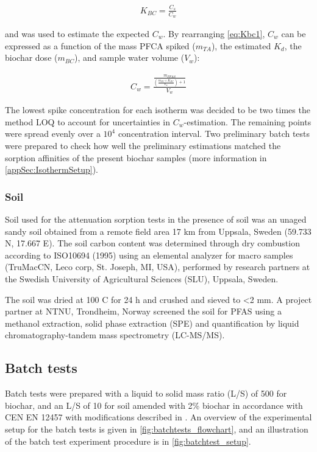 \begin{align}
    \label{eq:Kbc1}
    K_{BC} = \frac{C_s}{C_w}
\end{align}

and was used to estimate the expected $C_w$. By rearranging \cref{eq:Kbc1}, $C_w$ can be expressed as a function of the mass PFCA spiked ($m_{TA}$), the estimated $K_d$, the biochar dose ($m_{BC}$), and sample water volume ($V_w$):

\begin{align}
    \label{eq:Cw2}
    C_w=\frac{\frac{m_{PFAS}}{\left (\frac{m_{BC}\times K_{BC}}{V_w}\right)+1}}{V_w}
\end{align}

The lowest spike concentration for each isotherm was decided to be two times the method LOQ to account for uncertainties in $C_w$-estimation. The remaining points were spread evenly over a $10^4$ concentration interval. Two preliminary batch tests were prepared to check how well the preliminary estimations matched the sorption affinities of the present biochar samples (more information in \cref{appSec:IsothermSetup}).

\subsubsection{Soil}
Soil used for the attenuation sorption tests in the presence of soil was an unaged sandy soil obtained from a remote field area 17 km from Uppsala, Sweden (59.733 N, 17.667 E). The soil carbon content was determined through dry combustion according to ISO10694 (1995) using an elemental analyzer for macro samples (TruMac\textregistered CN, Leco corp, St. Joseph, MI, USA), performed by research partners at the Swedish University of Agricultural Sciences (SLU), Uppsala, Sweden. 

The soil was dried at 100 \textdegree C for 24 h and crushed and sieved to \textless 2 mm.  A project partner at NTNU, Trondheim, Norway screened the soil for PFAS using a methanol extraction, solid phase extraction (SPE) and quantification by liquid chromatography-tandem mass spectrometry (LC-MS/MS). 

\subsection{Batch tests\label{sec:S-BC}}
Batch tests were prepared with a liquid to solid mass ratio (L/S) of 500 for biochar, and an L/S of 10 for soil amended with 2\% biochar in accordance with CEN EN 12457 with modifications described in \citep{Hale2017fire, kupryianchyk2016biochar}. An overview of the experimental setup for the batch tests is given in \cref{fig:batchtests_flowchart}, and an illustration of the batch test experiment procedure is in \cref{fig:batchtest_setup}.

